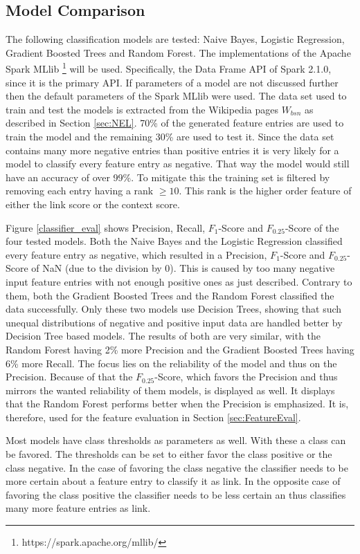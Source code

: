 \subsection{Model Comparison}
The following classification models are tested: Naive Bayes, Logistic Regression, Gradient Boosted Trees and Random Forest. The implementations of the Apache Spark MLlib \footnote{https://spark.apache.org/mllib/} will be used. Specifically, the Data Frame API of Spark 2.1.0, since it is the primary API. If parameters of a model are not discussed further then the default parameters of the Spark  MLlib were used. The data set used to train and test the models is extracted from the Wikipedia pages $W_{bsn}$ as described in Section \ref{sec:NEL}. 70\% of the generated feature entries are used to train the model and the remaining 30\% are used to test it. Since the data set contains many more negative entries than positive entries it is very likely for a model to classify every feature entry as negative. That way the model would still have an accuracy of over 99\%. To mitigate this the training set is filtered by removing each entry having a rank $\geq 10$. This rank is the higher order feature of either the link score or the context score.\par
Figure \ref{classifier_eval} shows Precision, Recall, $F_1$-Score and $F_{0.25}$-Score of the four tested models. Both the Naive Bayes and the Logistic Regression classified every feature entry as negative, which resulted in a Precision, $F_1$-Score and $F_{0.25}$-Score of NaN (due to the division by 0). This is caused by too many negative input feature entries with not enough positive ones as just described. Contrary to them, both the Gradient Boosted Trees and the Random Forest classified the data successfully. Only these two models use Decision Trees, showing that such unequal distributions of negative and positive input data are handled better by Decision Tree based models. The results of both are very similar, with the Random Forest having 2\% more Precision and the Gradient Boosted Trees having 6\% more Recall. The focus lies on the reliability of the model and thus on the Precision. Because of that the $F_{0.25}$-Score, which favors the Precision and thus mirrors the wanted reliability of them models, is displayed as well. It displays that the Random Forest performs better when the Precision is emphasized. It is, therefore, used for the feature evaluation in Section \ref{sec:FeatureEval}.\par
Most models have class thresholds as parameters as well. With these a class can be favored. The thresholds can be set to either favor the class positive or the class negative. In the case of favoring the class negative the classifier needs to be more certain about a feature entry to classify it as link. In the opposite case of favoring the class positive the classifier needs to be less certain an thus classifies many more feature entries as link.\par
